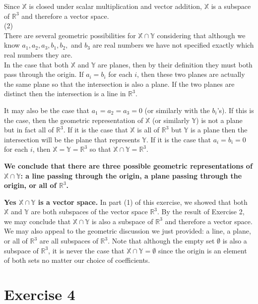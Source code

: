\documentclass[11pt]{article}
\begin{document}
Since $\mathbb{X}$ is closed under scalar multiplication and vector addition, $\mathbb{X}$ is a subspace of $\mathbb{R}^3$ and therefore a vector space.\\

(2)\\

There are several geometric possibilities for $\mathbb{X}\cap \mathbb{Y}$ considering that although we know $a_1,a_2,a_3,b_1,b_2,$ and $b_3$ are real numbers we have not specified exactly which real numbers they are.\\

In the case that both $\mathbb{X}$ and $\mathbb{Y}$ are planes, then by their definition they must both pass through the origin. If $a_i = b_i$ for each $i$, then these two planes are actually the same plane so that the intersection is also a plane. If the two planes are distinct then the intersection is a line in $\mathbb{R}^3$.

It may also be the case that $a_1 = a_2 = a_3 = 0$ (or similarly with the $b_i$'s). If this is the case, then the geometric representation of $\mathbb{X}$ (or similarly $\mathbb{Y}$) is not a plane but in fact all of $\mathbb{R}^3$. If it is the case that $\mathbb{X}$ is all of $\mathbb{R}^3$ but $\mathbb{Y}$ is a plane then the intersection will be the plane that represents $\mathbb{Y}$. If it is the case that $a_i = b_i = 0$ for each $i$, then $\mathbb{X} = \mathbb{Y} = \mathbb{R}^3$ so that $\mathbb{X} \cap \mathbb{Y} = \mathbb{R}^3$.

\textbf{We conclude that there are three possible geometric representations of $\mathbb{X}\cap\mathbb{Y}$: a line passing through the origin, a plane passing through the origin, or all of $\mathbb{R}^3$.}


\textbf{Yes $\mathbb{X}\cap\mathbb{Y}$ is a vector space.} In part (1) of this exercise, we showed that both $\mathbb{X}$ and $\mathbb{Y}$ are both subspaces of the vector space $\mathbb{R}^3$. By the result of Exercise 2, we may conclude that $\mathbb{X}\cap \mathbb{Y}$ is also a subspace of $\mathbb{R}^3$ and therefore a vector space. We may also appeal to the geometric discussion we just provided: a line, a plane, or all of $\mathbb{R}^3$ are all subspaces of $\mathbb{R}^3$. Note that although the empty set $\emptyset$ is also a subspace of $\mathbb{R}^3$, it is never the case that $\mathbb{X}\cap \mathbb{Y} = \emptyset$ since the origin is an element of both sets no matter our choice of coefficients.

\section*{Exercise 4}
\end{document}
